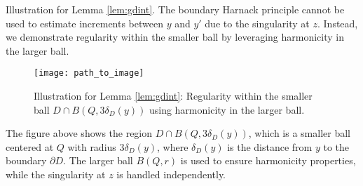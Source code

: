 \documentclass{article}
\begin{document}
Illustration for Lemma \ref{lem:gdint}. The boundary Harnack principle cannot be used to estimate increments between \( y \) and \( y' \) due to the singularity at \( z \). Instead, we demonstrate regularity within the smaller ball by leveraging harmonicity in the larger ball.

\begin{figure}[h]
    \centering
    \texttt{[image: path\_to\_image]} %
    \caption{Illustration for Lemma \ref{lem:gdint}: Regularity within the smaller ball \( D \cap B(Q, 3\delta_D(y)) \) using harmonicity in the larger ball.}
    \label{fig:gdint_illustration}
\end{figure}

The figure above shows the region \( D \cap B(Q, 3\delta_D(y)) \), which is a smaller ball centered at \( Q \) with radius \( 3\delta_D(y) \), where \( \delta_D(y) \) is the distance from \( y \) to the boundary \( \partial D \). The larger ball \( B(Q, r) \) is used to ensure harmonicity properties, while the singularity at \( z \) is handled independently.
\end{document}
